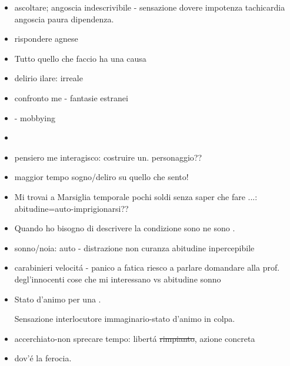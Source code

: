 \begin{itemize}

\item ascoltare; angoscia indescrivibile - sensazione dovere impotenza tachicardia angoscia paura dipendenza. 

\item rispondere agnese

\item Tutto quello che faccio ha una causa

\item delirio ilare: irreale

\item confronto me - fantasie estranei

\item {} - mobbying

\item {}

\item pensiero me interagisco: costruire un. personaggio??

\item maggior tempo sogno/deliro su quello che sento!

\item Mi trovai a Marsiglia temporale pochi soldi senza saper che fare ...: abitudine=auto-imprigionarsi??

\item Quando ho bisogno di descrivere la condizione sono ne sono  .

\item sonno/noia: auto - distrazione non curanza abitudine inpercepibile

\item carabinieri velocit\'a - panico a fatica riesco a parlare
domandare alla prof. degl'innocenti cose che mi interessano
vs abitudine sonno

\item Stato d’animo per una .

Sensazione interlocutore immaginario-stato d’animo in colpa.

\item accerchiato-non sprecare tempo: libert\'a \sout{rimpianto}, azione concreta

\item dov’\'e la ferocia.


\end{itemize}
